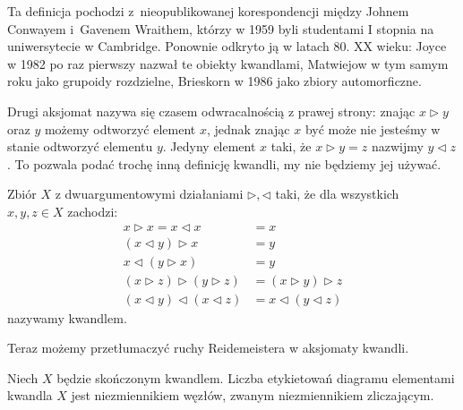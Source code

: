\begin{comment}
\[
    \begin{tikzpicture}[scale=0.18, baseline=0]
        \path[TIKZ_ARCH,Latex-] (-4,0) -- (4,8);
        \path[TIKZ_ARCH] (4,0) -- (1,3);
        \path[TIKZ_ARCH] (-1,5) -- (-4,8);
        \node[darkblue] at (-4, 0)[above left] {$y$};
        \node[darkblue] at (4, 0)[above right] {$x \triangleright y$};
        \node[darkblue] at (-4, 8)[below left] {$x$};
    \end{tikzpicture}
\]
\end{comment}

Ta definicja pochodzi z~nieopublikowanej korespondencji między Johnem Conwayem i~Gavenem Wraithem, którzy w 1959 byli studentami I stopnia na uniwersytecie w Cambridge.
Ponownie odkryto ją w latach 80. XX wieku: Joyce w 1982 po raz pierwszy nazwał te obiekty kwandlami, Matwiejow w tym samym roku jako grupoidy rozdzielne, Brieskorn w 1986 jako zbiory automorficzne.

Drugi aksjomat nazywa się czasem odwracalnością z prawej strony: znając $x \triangleright y$ oraz $y$ możemy odtworzyć element $x$, jednak znając $x$ być może nie jesteśmy w stanie odtworzyć elementu $y$.
Jedyny element $x$ taki, że $x \triangleright y = z$ nazwijmy $y \triangleleft z$.
To pozwala podać trochę inną definicję kwandli, my nie będziemy jej używać.

\begin{definition}
    Zbiór $X$ z dwuargumentowymi działaniami $\triangleright, \triangleleft$ taki, że dla wszystkich $x, y, z \in X$ zachodzi:
    \begin{align*}
    x \triangleright x = x \triangleleft x & = x \\
    (x \triangleleft y) \triangleright x & = y \\
    x \triangleleft (y \triangleright x) & = y \\
     (x \triangleright z) \triangleright (y \triangleright z) & = (x \triangleright y) \triangleright z \\
    (x \triangleleft y) \triangleleft (x \triangleleft z) & = x \triangleleft (y \triangleleft z)
    \end{align*}
    nazywamy kwandlem.
\end{definition}

Teraz możemy przetłumaczyć ruchy Reidemeistera w aksjomaty kwandli.

\begin{proposition}
    Niech $X$ będzie skończonym kwandlem.
    Liczba etykietowań diagramu elementami kwandla $X$ jest niezmiennikiem węzłów, zwanym niezmiennikiem zliczającym.
\end{proposition}

